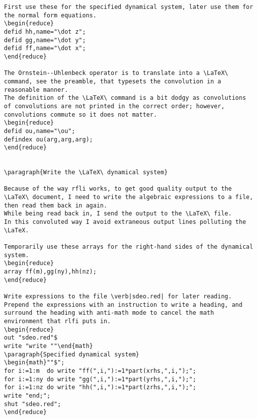 \documentclass[11pt,a5paper]{article}
\def\ou\big(#1,#2,#3\big){{e^{\if#31\else#3\fi t}\star}#1\,}
\begin{document}
\begin{reduce}
\begin{verbatim}
First use these for the specified dynamical system, later use them for the normal form equations.
\begin{reduce}
defid hh,name="\dot z";
defid gg,name="\dot y";
defid ff,name="\dot x";
\end{reduce}

The Ornstein--Uhlenbeck operator is to translate into a \LaTeX\ command, see the preamble, that typesets the convolution in a reasonable manner.
The definition of the \LaTeX\ command is a bit dodgy as convolutions of convolutions are not printed in the correct order; however,  convolutions commute so it does not matter.
\begin{reduce}
defid ou,name="\ou";
defindex ou(arg,arg,arg);
\end{reduce}


\paragraph{Write the \LaTeX\ dynamical system}

Because of the way rfli works, to get good quality output to the \LaTeX\ document, I need to write the algebraic expressions to a file, then read them back in again.
While being read back in, I send the output to the \LaTeX\ file.
In this convoluted way I avoid extraneous output lines polluting the \LaTeX. 

Temporarily use these arrays for the right-hand sides of the dynamical system.
\begin{reduce}
array ff(m),gg(ny),hh(nz);
\end{reduce}

Write expressions to the file \verb|sdeo.red| for later reading.
Prepend the expressions with an instruction to write a heading, and surround the heading with anti-math mode to cancel the math environment that rlfi puts in.
\begin{reduce}
out "sdeo.red"$
write "write ""\end{math}
\paragraph{Specified dynamical system}
\begin{math}""$";
for i:=1:m  do write "ff(",i,"):=1*part(xrhs,",i,");"; 
for i:=1:ny do write "gg(",i,"):=1*part(yrhs,",i,");";
for i:=1:nz do write "hh(",i,"):=1*part(zrhs,",i,");"; 
write "end;";
shut "sdeo.red";
\end{reduce}


\end{verbatim}
\end{reduce}
\end{document}
